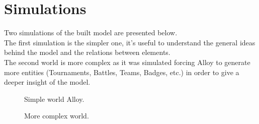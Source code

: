 

\section{Simulations}
\label{sec: sim}%
Two simulations of the built model are presented below.\\
The first simulation is the simpler one, it's useful to understand the general ideas behind the model and the relations between elements.\\
The second world is more complex as it was simulated forcing Alloy to generate more entities (Tournaments, Battles, Teams, Badges, etc.) 
in order to give a deeper insight of the model.

\begin{sidewaysfigure}
	\begin{figure} [H]
		\begin{center}
			\caption{Simple world Alloy.}
			\label{fig: simple_world_alloy}
		\end{center}
	\end{figure}
\end{sidewaysfigure}

\begin{sidewaysfigure}
	\begin{figure} [H]
		\begin{center}
			\caption{More complex world.}
			\label{fig: many_appointments_world_alloy}
		\end{center}
	\end{figure}
\end{sidewaysfigure}